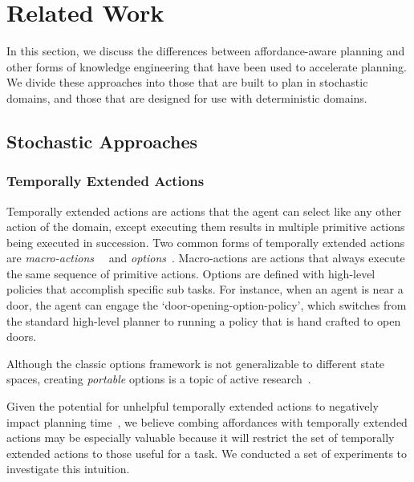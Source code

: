 \documentclass[conference]{IEEEtran}
\begin{document}
\section{Related Work}
\label{sec:related-work}

In this section, we discuss the differences between
affordance-aware planning and other forms of knowledge engineering that
have been used to accelerate planning. We divide these approaches
into those that are built to plan in stochastic domains, and those that are
designed for use with deterministic domains.

\subsection{Stochastic Approaches}

\subsubsection{Temporally Extended Actions}
Temporally extended actions are actions that the agent can
select like any other action of the domain, except executing them
results in multiple primitive actions being executed in
succession. Two common forms of temporally extended actions are {\em
  macro-actions}~\cite{hauskrecht98} ~and {\em options}~\cite{sutton99}. 
Macro-actions are actions that always
execute the same sequence of primitive actions. Options are defined
with high-level policies that accomplish specific sub tasks. For
instance, when an agent is near a door, the agent can engage the
`door-opening-option-policy', which switches from the standard
high-level planner to running a policy that is hand crafted to open
doors. 

Although the classic options framework is not generalizable to different state spaces,
creating {\em portable} options is a topic of active research~\cite{konidaris07,konidaris2009efficient,Ravindran03analgebraic,croonenborghs2008learning,andre2002state,konidaris2012transfer}.

Given the potential for unhelpful temporally extended actions to negatively impact planning time~\cite{Jong:2008zr}, we believe combing affordances with temporally extended actions
may be especially valuable because it will restrict the set of temporally extended actions to those
useful for a task. We conducted a set of experiments to investigate this intuition.
\end{document}
